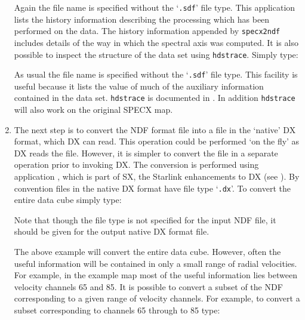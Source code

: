 \documentclass[twoside,11pt]{starlink}
\begin{document}
\begin{enumerate}
   Again the file name is specified without the `\texttt{.sdf}' file type.
   This application lists the history information describing the
   processing which has been performed on the data.  The history
   information appended by \texttt{specx2ndf} includes details of the way
   in which the spectral axis was computed.  It is also possible to
   inspect the structure of the data set using \texttt{hdstrace}.  Simply
   type:

\begin{terminalv}
\end{terminalv}

   As usual the file name is specified without the `\texttt{.sdf}' file type.
   This facility is useful because it lists the value of much of the
   auxiliary information contained in the data set.  \texttt{hdstrace}
   is documented in \cite{SUN102}.  In addition
   \texttt{hdstrace} will also work on the original SPECX map.

  \item The next step is to convert the NDF format file into a file
   in the `native' DX format, which DX can read.  This operation
   could be performed `on the fly' as DX reads the file.  However, it
   is simpler to convert the file in a separate operation prior to
   invoking DX.  The conversion is performed using application
   , which is part of SX, the
   Starlink enhancements to DX (see \cite{SUN203}).
   By convention files in the native DX format have file type `\texttt{.dx}'.
   To convert the entire data cube simply type:

\begin{terminalv}
\end{terminalv}

   Note that though the file type is not specified for the input NDF
   file, it should be given for the output native DX format file.

   The above example will convert the entire data cube.  However, often
   the useful information will be contained in only a small range of
   radial velocities.  For example, in the example map most of the
   useful information lies between velocity channels 65 and 85.  It is
   possible to convert a subset of the NDF corresponding to a given
   range of velocity channels.  For example, to convert a subset
   corresponding to channels 65 through to 85 type:


\end{enumerate}
\end{document}
